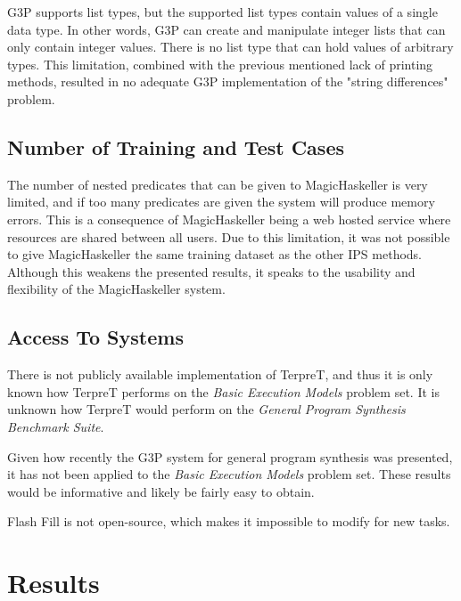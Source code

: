 G3P supports list types, but the supported list types contain values of a single data type. In other words, G3P can create and manipulate integer lists that can only contain integer values. There is no list type that can hold values of arbitrary types. This limitation, combined with the previous mentioned lack of printing methods, resulted in no adequate G3P implementation of the "string differences" problem.

\subsection{Number of Training and Test Cases}

The number of nested predicates that can be given to MagicHaskeller is very limited, and if too many predicates are given the system will produce memory errors. This is a consequence of MagicHaskeller being a web hosted service where resources are shared between all users. Due to this limitation, it was not possible to give MagicHaskeller the same training dataset as the other IPS methods. Although this weakens the presented results, it speaks to the usability and flexibility of the MagicHaskeller system.

\subsection{Access To Systems}

There is not publicly available implementation of TerpreT, and thus it is only known how TerpreT performs on the \emph{Basic Execution Models} problem set. It is unknown how TerpreT would perform on the \emph{General Program Synthesis Benchmark Suite}.

Given how recently the G3P system for general program synthesis was presented, it has not been applied to the \emph{Basic Execution Models} problem set. These results would be informative and likely be fairly easy to obtain.

Flash Fill is not open-source, which makes it impossible to modify for new tasks.

\section{Results}

